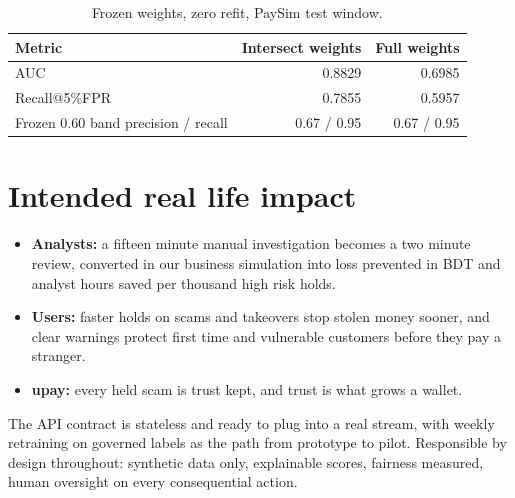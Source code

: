 \documentclass[11pt,a4paper]{article}
\begin{document}
\begin{table}[htbp]
\centering
\caption{Frozen weights, zero refit, PaySim test window.}
\label{tab:zeroshot}
\begin{tabular}{@{}lrr@{}}
\toprule
Metric & Intersect weights & Full weights \\
\midrule
AUC & 0.8829 & 0.6985 \\
Recall@5\%FPR & 0.7855 & 0.5957 \\
Frozen 0.60 band precision / recall & 0.67 / 0.95 & 0.67 / 0.95 \\
\bottomrule
\end{tabular}
\end{table}

\section{Intended real life impact}

\begin{itemize}[nosep]
  \item \textbf{Analysts:} a fifteen minute manual investigation becomes a two
    minute review, converted in our business simulation into loss prevented
    in BDT and analyst hours saved per thousand high risk holds.
  \item \textbf{Users:} faster holds on scams and takeovers stop stolen money
    sooner, and clear warnings protect first time and vulnerable customers
    before they pay a stranger.
  \item \textbf{upay:} every held scam is trust kept, and trust is what grows
    a wallet.
\end{itemize}
The API contract is stateless and ready to plug into a real stream, with
weekly retraining on governed labels as the path from prototype to pilot.
Responsible by design throughout: synthetic data only, explainable scores,
fairness measured, human oversight on every consequential action.
\end{document}
